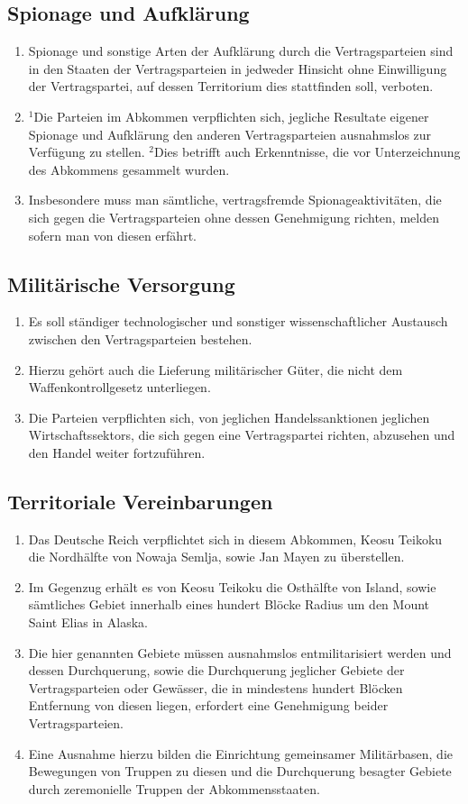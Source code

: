 \documentclass{article}
\begin{document}
\subsection{Spionage und Aufklärung}
\begin{enumerate}[(1)]
    \item Spionage und sonstige Arten der Aufklärung durch die Vertragsparteien sind in den Staaten der Vertragsparteien in jedweder Hinsicht ohne Einwilligung der Vertragspartei, auf dessen Territorium dies stattfinden soll, verboten.
    \item ${^1}$Die Parteien im Abkommen verpflichten sich, jegliche Resultate eigener Spionage und Aufklärung den anderen Vertragsparteien ausnahmslos zur Verfügung zu stellen. ${^2}$Dies betrifft auch Erkenntnisse, die vor Unterzeichnung des Abkommens gesammelt wurden.
    \item Insbesondere muss man sämtliche, vertragsfremde Spionageaktivitäten, die sich gegen die Vertragsparteien ohne dessen Genehmigung richten, melden sofern man von diesen erfährt.
\end{enumerate}

\subsection{Militärische Versorgung}
\begin{enumerate}[(1)]
    \item Es soll ständiger technologischer und sonstiger wissenschaftlicher Austausch zwischen den Vertragsparteien bestehen.
    \item Hierzu gehört auch die Lieferung militärischer Güter, die nicht dem Waffenkontrollgesetz unterliegen.
    \item Die Parteien verpflichten sich, von jeglichen Handelssanktionen jeglichen Wirtschaftssektors, die sich gegen eine Vertragspartei richten, abzusehen und den Handel weiter fortzuführen.
\end{enumerate}

\subsection{Territoriale Vereinbarungen}
\begin{enumerate}[(1)]
    \item Das Deutsche Reich verpflichtet sich in diesem Abkommen, Keosu Teikoku die Nordhälfte von Nowaja Semlja, sowie Jan Mayen zu überstellen.
    \item Im Gegenzug erhält es von Keosu Teikoku die Osthälfte von Island, sowie sämtliches Gebiet innerhalb eines hundert Blöcke Radius um den Mount Saint Elias in Alaska.
    \item Die hier genannten Gebiete müssen ausnahmslos entmilitarisiert werden und dessen Durchquerung, sowie die Durchquerung jeglicher Gebiete der Vertragsparteien oder Gewässer, die in mindestens hundert Blöcken Entfernung von diesen liegen, erfordert eine Genehmigung beider Vertragsparteien.
    \item Eine Ausnahme hierzu bilden die Einrichtung gemeinsamer Militärbasen, die Bewegungen von Truppen zu diesen und die Durchquerung besagter Gebiete durch zeremonielle Truppen der Abkommensstaaten.
\end{enumerate}
\end{document}
